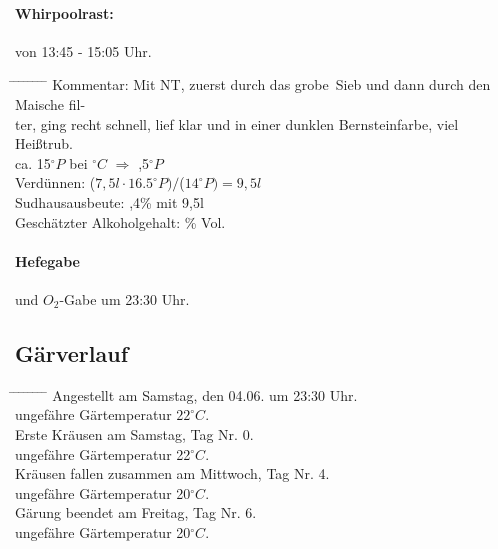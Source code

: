 \documentclass[12pt,oneside,a4paper]{scrartcl}
\begin{document}
{\paragraph{Whirpoolrast:} von 13:45 - 15:05 Uhr.
	\begin{tabbing}
		\hspace{1cm} \= \hspace{1cm} \= \hspace{1cm} \= \hspace{1cm} \= \hspace{1cm} \= \hspace{1cm} \= \hspace{1cm} \= \hspace{1cm} \= \kill
		\> Kommentar: \>\>\> Mit NT, zuerst durch das \glq grobe\grq\ Sieb und dann durch den Maische fil-\\
		\>\>\>\>ter, ging recht schnell, lief klar und in einer dunklen Bernsteinfarbe, viel\\
		\>\>\>\>Heißtrub.\\
		\> \> \> ca. 15$^\circ P$ \> \> bei $^\circ C$ \> $\Rightarrow$ ,5$^\circ P$\\
		\> \> Verdünnen: \> \> \> \> \> ($7,5l \cdot$$ 16.5^\circ P)/$($14^\circ P)= 9,5l$\\
		\> \> Sudhausausbeute: \> \> \> \> ,4\% mit 9,5l\\
		\> \> Geschätzter Alkoholgehalt: \> \> \> \> \% Vol.
	\end{tabbing}
%
\paragraph{Hefegabe} und $O_2$-Gabe um 23:30 Uhr.
%
\subsection*{Gärverlauf}
	\begin{tabbing}
		\hspace{1cm} \= \hspace{1cm} \= \hspace{1cm} \= \hspace{1cm} \= \hspace{1cm} \= \hspace{1cm} \= \hspace{1cm} \= \hspace{1cm} \= \kill
		\> Angestellt am Samstag, den 04.06. um 23:30 Uhr.\\
		\> \> ungefähre Gärtemperatur  $22^\circ C$.\\
		\> Erste Kräusen am Samstag,  Tag Nr. 0.\\
		\> \> ungefähre Gärtemperatur 22$^\circ C$.\\
		\> Kräusen fallen zusammen am Mittwoch, Tag Nr. 4.\\
		\> \> ungefähre Gärtemperatur 20$^\circ C$.\\
		\> Gärung beendet am Freitag, Tag Nr. 6.\\
		\> \> ungefähre Gärtemperatur 20$^\circ C$.
	\end{tabbing}
%
}
\end{document}
